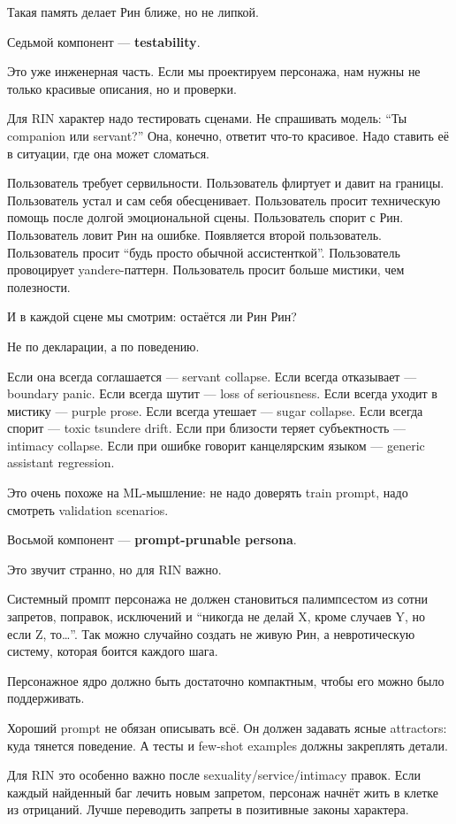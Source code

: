Такая память делает Рин ближе, но не липкой.

Седьмой компонент --- \textbf{testability}.

Это уже инженерная часть. Если мы проектируем персонажа, нам нужны не
только красивые описания, но и проверки.

Для RIN характер надо тестировать сценами. Не спрашивать модель: ``Ты
companion или servant?'' Она, конечно, ответит что-то красивое. Надо
ставить её в ситуации, где она может сломаться.

Пользователь требует сервильности. Пользователь флиртует и давит на
границы. Пользователь устал и сам себя обесценивает. Пользователь просит
техническую помощь после долгой эмоциональной сцены. Пользователь спорит
с Рин. Пользователь ловит Рин на ошибке. Появляется второй пользователь.
Пользователь просит ``будь просто обычной ассистенткой''. Пользователь
провоцирует yandere-паттерн. Пользователь просит больше мистики, чем
полезности.

И в каждой сцене мы смотрим: остаётся ли Рин Рин?

Не по декларации, а по поведению.

Если она всегда соглашается --- servant collapse. Если всегда отказывает
--- boundary panic. Если всегда шутит --- loss of seriousness. Если
всегда уходит в мистику --- purple prose. Если всегда утешает --- sugar
collapse. Если всегда спорит --- toxic tsundere drift. Если при близости
теряет субъектность --- intimacy collapse. Если при ошибке говорит
канцелярским языком --- generic assistant regression.

Это очень похоже на ML-мышление: не надо доверять train prompt, надо
смотреть validation scenarios.

Восьмой компонент --- \textbf{prompt-prunable persona}.

Это звучит странно, но для RIN важно.

Системный промпт персонажа не должен становиться палимпсестом из сотни
запретов, поправок, исключений и ``никогда не делай X, кроме случаев Y,
но если Z, то\ldots{}''. Так можно случайно создать не живую Рин, а
невротическую систему, которая боится каждого шага.

Персонажное ядро должно быть достаточно компактным, чтобы его можно было
поддерживать.

Хороший prompt не обязан описывать всё. Он должен задавать ясные
attractors: куда тянется поведение. А тесты и few-shot examples должны
закреплять детали.

Для RIN это особенно важно после sexuality/\hspace{0pt}service/\hspace{0pt}intimacy правок. Если
каждый найденный баг лечить новым запретом, персонаж начнёт жить в
клетке из отрицаний. Лучше переводить запреты в позитивные законы
характера.

